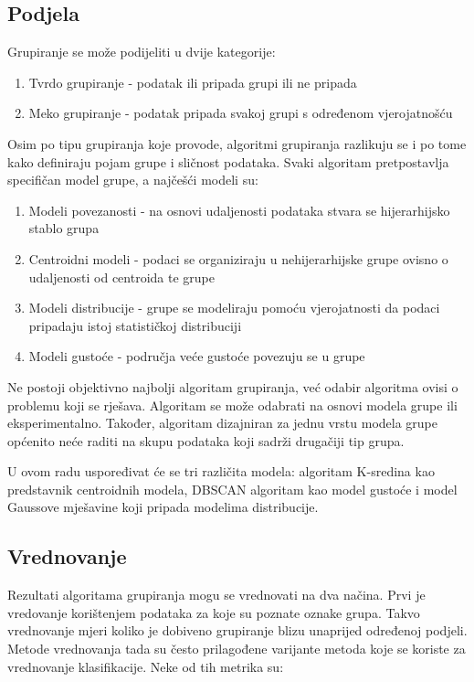 \documentclass[utf8, diplomski, numeric]{fer}
\begin{document}
\subsection{Podjela}
Grupiranje se može podijeliti u dvije kategorije:

\begin{enumerate}
\item Tvrdo grupiranje - podatak ili pripada grupi ili ne pripada
\item Meko grupiranje - podatak pripada svakoj grupi s određenom vjerojatnošću
\end{enumerate}

Osim po tipu grupiranja koje provode, algoritmi grupiranja razlikuju se i po tome kako definiraju pojam grupe i sličnost podataka. Svaki algoritam pretpostavlja specifičan model grupe, a najčešći modeli su:

\begin{enumerate}
\item Modeli povezanosti - na osnovi udaljenosti podataka stvara se hijerarhijsko stablo grupa 
\item Centroidni modeli - podaci se organiziraju u nehijerarhijske grupe ovisno o udaljenosti od centroida te grupe
\item Modeli distribucije - grupe se modeliraju pomoću vjerojatnosti da podaci pripadaju istoj statističkoj distribuciji
\item Modeli gustoće - područja veće gustoće povezuju se u grupe
\end{enumerate}

Ne postoji objektivno najbolji algoritam grupiranja, već odabir algoritma ovisi o problemu koji se rješava. Algoritam se može odabrati na osnovi modela grupe ili eksperimentalno. Također, algoritam dizajniran za jednu vrstu modela grupe općenito neće raditi na skupu podataka koji sadrži drugačiji tip grupa.

U ovom radu uspoređivat će se tri različita modela: algoritam K-sredina kao predstavnik centroidnih modela, DBSCAN algoritam kao model gustoće i model Gaussove mješavine koji pripada modelima distribucije.

\subsection{Vrednovanje}
Rezultati algoritama grupiranja mogu se vrednovati na dva načina. Prvi je vredovanje korištenjem podataka za koje su poznate oznake grupa. Takvo vrednovanje mjeri koliko je dobiveno grupiranje blizu unaprijed određenoj podjeli. Metode vrednovanja tada su često prilagođene varijante metoda koje se koriste za vrednovanje klasifikacije. Neke od tih metrika su:
\end{document}
